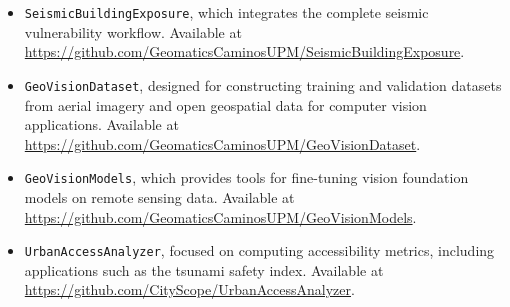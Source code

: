 \begin{itemize}
    \item \texttt{SeismicBuildingExposure}, which integrates the complete seismic vulnerability workflow. Available at \url{https://github.com/GeomaticsCaminosUPM/SeismicBuildingExposure}.

    \item \texttt{GeoVisionDataset}, designed for constructing training and validation datasets from aerial imagery and open geospatial data for computer vision applications. Available at \url{https://github.com/GeomaticsCaminosUPM/GeoVisionDataset}.

    \item \texttt{GeoVisionModels}, which provides tools for fine-tuning vision foundation models on remote sensing data. Available at \url{https://github.com/GeomaticsCaminosUPM/GeoVisionModels}.

    \item \texttt{UrbanAccessAnalyzer}, focused on computing accessibility metrics, including applications such as the tsunami safety index. Available at \url{https://github.com/CityScope/UrbanAccessAnalyzer}.
\end{itemize}


\newpage